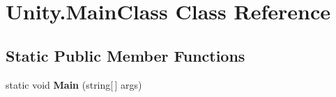 \hypertarget{class_unity_1_1_main_class}{\section{Unity.\+Main\+Class Class Reference}
\label{class_unity_1_1_main_class}
}
\subsection*{Static Public Member Functions}
\begin{DoxyCompactItemize}
\item 
\hypertarget{class_unity_1_1_main_class_a6e895b26dc9e70c6e04adc4121368b44}{static void {\bfseries Main} (string\mbox{[}$\,$\mbox{]} args)}\label{class_unity_1_1_main_class_a6e895b26dc9e70c6e04adc4121368b44}

\end{DoxyCompactItemize}
